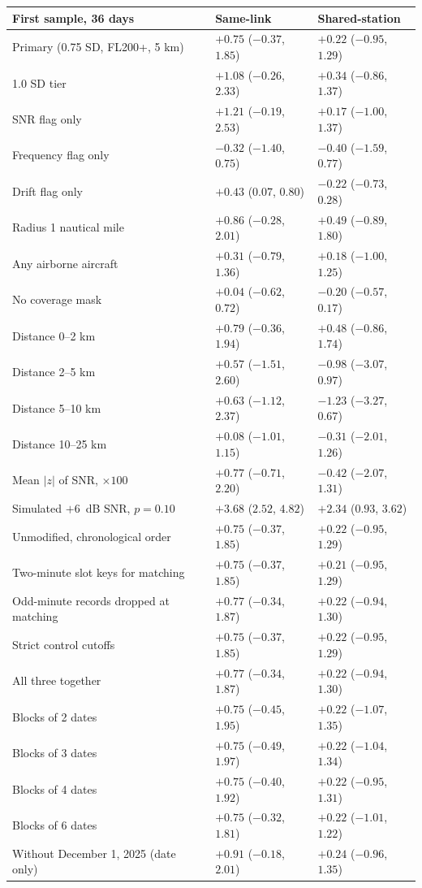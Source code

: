 \documentclass[11pt]{article}
\begin{document}
\begin{appendices}
\begin{center}
\small
\begin{tabular}{lll}
\toprule
First sample, 36 days & Same-link & Shared-station \\
\midrule
Primary (0.75 SD, FL200+, 5 km) & $+0.75$ ($-0.37$, $1.85$) & $+0.22$ ($-0.95$, $1.29$) \\
1.0 SD tier & $+1.08$ ($-0.26$, $2.33$) & $+0.34$ ($-0.86$, $1.37$) \\
SNR flag only & $+1.21$ ($-0.19$, $2.53$) & $+0.17$ ($-1.00$, $1.37$) \\
Frequency flag only & $-0.32$ ($-1.40$, $0.75$) & $-0.40$ ($-1.59$, $0.77$) \\
Drift flag only & $+0.43$ ($0.07$, $0.80$) & $-0.22$ ($-0.73$, $0.28$) \\
Radius 1 nautical mile & $+0.86$ ($-0.28$, $2.01$) & $+0.49$ ($-0.89$, $1.80$) \\
Any airborne aircraft & $+0.31$ ($-0.79$, $1.36$) & $+0.18$ ($-1.00$, $1.25$) \\
No coverage mask & $+0.04$ ($-0.62$, $0.72$) & $-0.20$ ($-0.57$, $0.17$) \\
Distance 0--2 km & $+0.79$ ($-0.36$, $1.94$) & $+0.48$ ($-0.86$, $1.74$) \\
Distance 2--5 km & $+0.57$ ($-1.51$, $2.60$) & $-0.98$ ($-3.07$, $0.97$) \\
Distance 5--10 km & $+0.63$ ($-1.12$, $2.37$) & $-1.23$ ($-3.27$, $0.67$) \\
Distance 10--25 km & $+0.08$ ($-1.01$, $1.15$) & $-0.31$ ($-2.01$, $1.26$) \\
Mean $|z|$ of SNR, $\times100$ & $+0.77$ ($-0.71$, $2.20$) & $-0.42$ ($-2.07$, $1.31$) \\
Simulated $+6$~dB SNR, $p=0.10$ & $+3.68$ ($2.52$, $4.82$) & $+2.34$ ($0.93$, $3.62$) \\
\midrule
Unmodified, chronological order & $+0.75$ ($-0.37$, $1.85$) & $+0.22$ ($-0.95$, $1.29$) \\
Two-minute slot keys for matching & $+0.75$ ($-0.37$, $1.85$) & $+0.21$ ($-0.95$, $1.29$) \\
Odd-minute records dropped at matching & $+0.77$ ($-0.34$, $1.87$) & $+0.22$ ($-0.94$, $1.30$) \\
Strict control cutoffs & $+0.75$ ($-0.37$, $1.85$) & $+0.22$ ($-0.95$, $1.29$) \\
All three together & $+0.77$ ($-0.34$, $1.87$) & $+0.22$ ($-0.94$, $1.30$) \\
Blocks of 2 dates & $+0.75$ ($-0.45$, $1.95$) & $+0.22$ ($-1.07$, $1.35$) \\
Blocks of 3 dates & $+0.75$ ($-0.49$, $1.97$) & $+0.22$ ($-1.04$, $1.34$) \\
Blocks of 4 dates & $+0.75$ ($-0.40$, $1.92$) & $+0.22$ ($-0.95$, $1.31$) \\
Blocks of 6 dates & $+0.75$ ($-0.32$, $1.81$) & $+0.22$ ($-1.01$, $1.22$) \\
Without December 1, 2025 (date only) & $+0.91$ ($-0.18$, $2.01$) & $+0.24$ ($-0.96$, $1.35$) \\
\bottomrule
\end{tabular}
\end{center}


\end{appendices}
\end{document}

